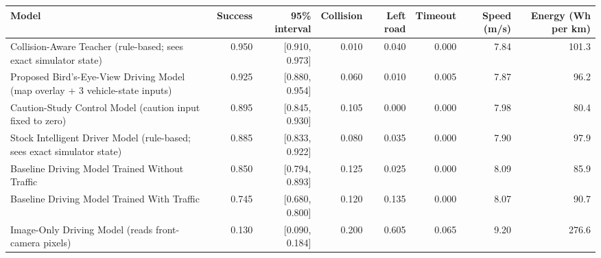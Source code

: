\begin{tabular}{@{}lrrrrrrr@{}}\toprule
Model & Success & 95\% interval & Collision & Left road & Timeout & Speed (m/s) & Energy (Wh per km)\\\midrule
Collision-Aware Teacher (rule-based; sees exact simulator state) & 0.950 & [0.910, 0.973] & 0.010 & 0.040 & 0.000 & 7.84 & 101.3\\
Proposed Bird's-Eye-View Driving Model (map overlay + 3 vehicle-state inputs) & 0.925 & [0.880, 0.954] & 0.060 & 0.010 & 0.005 & 7.87 & 96.2\\
Caution-Study Control Model (caution input fixed to zero) & 0.895 & [0.845, 0.930] & 0.105 & 0.000 & 0.000 & 7.98 & 80.4\\
Stock Intelligent Driver Model (rule-based; sees exact simulator state) & 0.885 & [0.833, 0.922] & 0.080 & 0.035 & 0.000 & 7.90 & 97.9\\
Baseline Driving Model Trained Without Traffic & 0.850 & [0.794, 0.893] & 0.125 & 0.025 & 0.000 & 8.09 & 85.9\\
Baseline Driving Model Trained With Traffic & 0.745 & [0.680, 0.800] & 0.120 & 0.135 & 0.000 & 8.07 & 90.7\\
Image-Only Driving Model (reads front-camera pixels) & 0.130 & [0.090, 0.184] & 0.200 & 0.605 & 0.065 & 9.20 & 276.6\\
\bottomrule\end{tabular}
